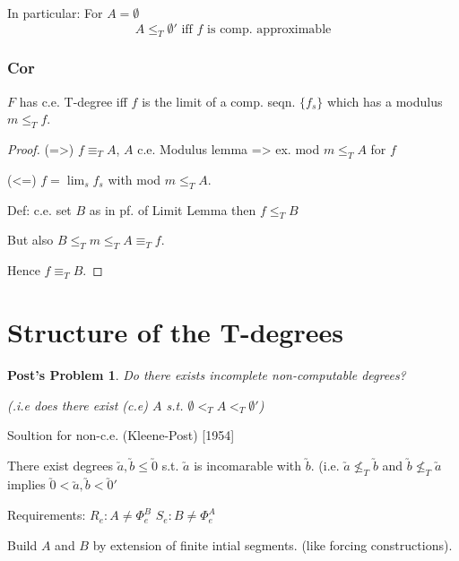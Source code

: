 \documentclass[12pt]{article}
\begin{document}
In particular: For $A = \emptyset$
\[
 A \le_T \emptyset' \text{ iff $f$ is comp. approximable}
\]

\subsubsection*{Cor}
$F$ has c.e. T-degree iff $f$ is the limit of a comp. seqn. 
$\{f_s\}$ which has a modulus $m \le_T f$.

\begin{proof}
 (=>) $f \equiv_T A$, $A$ c.e.
Modulus lemma => ex. mod $m \le_T A$ for $f$ 

(<=) $f = \lim_s f_s$ with mod $m \le_T A$.

Def: c.e. set $B$ as in pf. of Limit Lemma
then $f \le_T B$

But also $B \le_T m \le_T A \equiv_T f$.

Hence $f \equiv_T B$.
\end{proof}

\section*{Structure of the T-degrees}
\newtheorem{postp}{Post's Problem}
\begin{postp}
 Do there exists incomplete non-computable degrees?

(.i.e does there exist (c.e) $A$ s.t. $\emptyset <_T A <_T \emptyset'$)
\end{postp}

Soultion for non-c.e. (Kleene-Post) [1954]

There exist degrees $\utilde{a}, \utilde{b} \le \utilde{0}$
s.t. $\utilde{a}$ is incomarable with $\utilde{b}$.
(i.e. $\utilde{a} \not\le_T \utilde{b}$ and $\utilde{b} \not\le_T \utilde{a}$
implies $\utilde{0} < \utilde{a},\utilde{b} < \utilde{0}'$

Requirements:
$R_e: A \ne \Phi^B_e$
$S_e: B \ne \Phi^A_e$

Build $A$ and $B$ by extension of finite intial segments.
(like forcing constructions).
\end{document}
